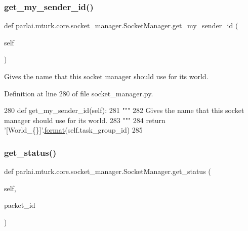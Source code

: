 \subsubsection{\texorpdfstring{get\+\_\+my\+\_\+sender\+\_\+id()}{get\_my\_sender\_id()}}
{\footnotesize\ttfamily def parlai.\+mturk.\+core.\+socket\+\_\+manager.\+Socket\+Manager.\+get\+\_\+my\+\_\+sender\+\_\+id (\begin{DoxyParamCaption}\item[{}]{self }\end{DoxyParamCaption})}

\begin{DoxyVerb}Gives the name that this socket manager should use for its world.
\end{DoxyVerb}
 

Definition at line 280 of file socket\+\_\+manager.\+py.


\begin{DoxyCode}
280     \textcolor{keyword}{def }get\_my\_sender\_id(self):
281         \textcolor{stringliteral}{"""}
282 \textcolor{stringliteral}{        Gives the name that this socket manager should use for its world.}
283 \textcolor{stringliteral}{        """}
284         \textcolor{keywordflow}{return} \textcolor{stringliteral}{'[World\_\{\}]'}.\hyperlink{namespaceparlai_1_1chat__service_1_1services_1_1messenger_1_1shared__utils_a32e2e2022b824fbaf80c747160b52a76}{format}(self.task\_group\_id)
285 
\end{DoxyCode}
\mbox{\label{classparlai_1_1mturk_1_1core_1_1socket__manager_1_1SocketManager_ad14d75f5b3a3e41a9133de9cd1611b8b}} 
\subsubsection{\texorpdfstring{get\+\_\+status()}{get\_status()}}
{\footnotesize\ttfamily def parlai.\+mturk.\+core.\+socket\+\_\+manager.\+Socket\+Manager.\+get\+\_\+status (\begin{DoxyParamCaption}\item[{}]{self,  }\item[{}]{packet\+\_\+id }\end{DoxyParamCaption})}


